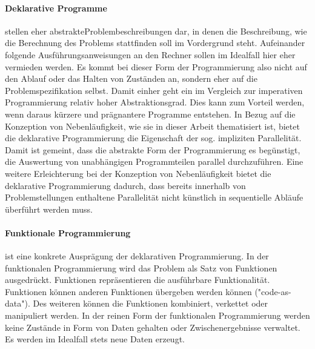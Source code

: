 \documentclass[12pt,oneside,a4paper,bibtotoc,liststotoc]{scrreprt}
\begin{document}
\paragraph{Deklarative Programme} stellen eher \glqq abstrakte\grqq Problembeschreibungen dar, in denen die Beschreibung, wie die Berechnung des Problems stattfinden soll im Vordergrund steht. Aufeinander folgende Ausführungsanweisungen an den Rechner sollen im Idealfall hier eher vermieden werden. Es kommt bei dieser Form der Programmierung also nicht auf den Ablauf oder das Halten von Zuständen an, sondern eher auf die Problemspezifikation selbst. Damit einher geht ein im Vergleich zur imperativen Programmierung relativ hoher Abstraktionsgrad. Dies kann zum Vorteil werden, wenn daraus kürzere und prägnantere Programme entstehen. In Bezug auf die Konzeption von Nebenläufigkeit, wie sie in dieser Arbeit thematisiert ist, bietet die deklarative Programmierung die Eigenschaft der sog. impliziten Parallelität. Damit ist gemeint, dass die abstrakte Form der Programmierung es begünstigt, die Auswertung von unabhängigen Programmteilen parallel durchzuführen. Eine weitere Erleichterung bei der Konzeption von Nebenläufigkeit bietet die deklarative Programmierung dadurch, dass bereits innerhalb von Problemstellungen enthaltene Parallelität nicht künstlich in sequentielle Abläufe überführt werden muss.\cite[vgl. S.5 ff.]{declarativProgrammingScript} 
\paragraph{Funktionale Programmierung} ist eine konkrete Ausprägung der deklarativen Programmierung. In der funktionalen Programmierung wird das Problem als Satz von Funktionen ausgedrückt. Funktionen repräsentieren die ausführbare Funktionalität. Funktionen können anderen Funktionen übergeben werden können ("code-as-data"). Des weiteren können die Funktionen kombiniert, verkettet oder manipuliert werden. In der reinen Form der funktionalen Programmierung werden keine Zustände in Form von Daten gehalten oder Zwischenergebnisse verwaltet. Es werden im Idealfall stets neue Daten erzeugt.\cite[]{funcProgrJava}   
\end{document}
